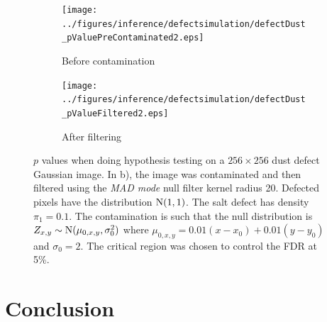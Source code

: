 \begin{figure}[htp]
	\centering
	\begin{subfigure}[b]{0.49\textwidth}
		\texttt{[image: ../figures/inference/defectsimulation/defectDust\_pValuePreContaminated2.eps]}
		\caption{Before contamination}
	\end{subfigure}
	\begin{subfigure}[b]{0.49\textwidth}
		\texttt{[image: ../figures/inference/defectsimulation/defectDust\_pValueFiltered2.eps]}
		\caption{After filtering}
	\end{subfigure}
	\caption{$p$ values when doing hypothesis testing on a $256 \times 256$ dust defect Gaussian image. In b), the image was contaminated and then filtered using the \emph{MAD mode} null filter kernel radius 20. Defected pixels have the distribution $\operatorname{N}(1,1)$. The salt defect has density $\pi_1 = 0.1$. The contamination is such that the null distribution is $Z_{x,y}\sim\operatorname{N}(\mu_{0,x,y},\sigma_0^2)$ where $\mu_{0,x,y} = 0.01 (x-x_0) + 0.01 (y-y_0)$ and $\sigma_0=2$. The critical region was chosen to control the FDR at 5\%.}
\end{figure}

\section{Conclusion}